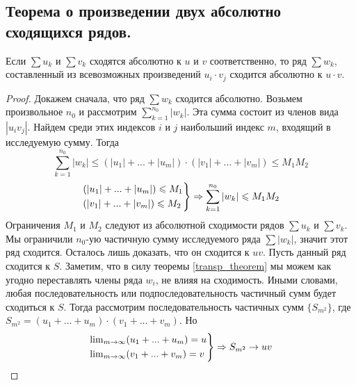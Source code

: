 \subsection{Теорема о произведении двух абсолютно сходящихся рядов.}
\begin{theorem}
    Если $\sum u_k$ и $\sum v_k$ сходятся абсолютно к $u$ и $v$ соответственно, то ряд $\sum w_k$, составленный из всевозможных произведений $u_i \cdot v_j$ сходится абсолютно к $u \cdot v$.
    \begin{proof}
        Докажем сначала, что ряд $\sum w_k$ сходится абсолютно. Возьмем произвольное $n_0$ и рассмотрим $\sum_{k=1}^{n_0} |w_k|$. Эта сумма состоит из членов вида $|u_iv_j|$. Найдем среди этих индексов $i$ и $j$ наибольший индекс $m$, входящий в исследуемую сумму. Тогда
        \[
            \sum_{k=1}^{n_0} |w_k| \leqslant (|u_1| + ... + |u_m|) \cdot (|v_1| + ... + |v_m|)
            \leqslant M_1 M_2
        \]
        \[
            \begin{rcases}
                (|u_1| + ... + |u_m|) \leqslant M_1 \\
                (|v_1| + ... + |v_m|) \leqslant M_2 \\
            \end{rcases}
            \Rightarrow
            \sum_{k=1}^{n_0} |w_k| \leqslant M_1 M_2
        \]
        Ограничения $M_1$ и $M_2$ следуют из абсолютной сходимости рядов $\sum u_k$ и $\sum v_k$. Мы ограничили $n_0$-ую частичную сумму исследуемого ряда $\sum |w_k|$, значит этот ряд сходится. Осталось лишь доказать, что он сходится к $uv$.
        \newline
        Пусть данный ряд сходится к $S$. Заметим, что в силу теоремы \ref{transp_theorem} мы можем как угодно переставлять члены ряда $w_i$, не влияя на сходимость. Иными словами, любая последовательность или подпоследовательность частичный сумм будет сходиться к $S$. Тогда рассмотрим последовательность частичных сумм $\{S_{m^2}\}$, где $S_{m^2} = (u_1 + ... + u_m) \cdot (v_1 + ... + v_m)$. Но
        \[
            \begin{rcases}
                \lim_{m \to \infty} (u_1 + ... + u_m) = u \\
                \lim_{m \to \infty} (v_1 + ... + v_m) = v \\
            \end{rcases}
            \Rightarrow
            S_{m^2} \to uv
        \]
    \end{proof}
\end{theorem}